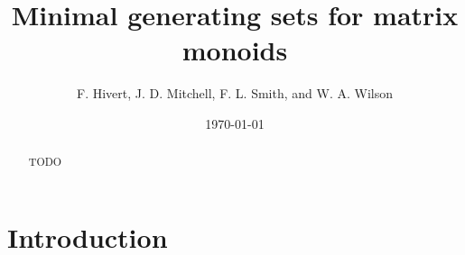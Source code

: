 \documentclass[11pt]{article}
\title{Minimal generating sets for matrix monoids}
\author{F. Hivert, J. D. Mitchell, F. L. Smith, and W. A. Wilson}
\date{\today}
\newcommand{\defn}[1]{\textbf{\textit{#1}}}
\numberwithin{equation}{section}
\renewcommand{\to}{\longrightarrow}
\newcommand{\B}{\mathbb{B}}
\newcommand{\Bn}{M_n(\B)}
\newcommand{\N}{\mathbb{N}}
\begin{document}
\maketitle

\begin{abstract}
  TODO
\end{abstract}

\section{Introduction}


\end{document}
